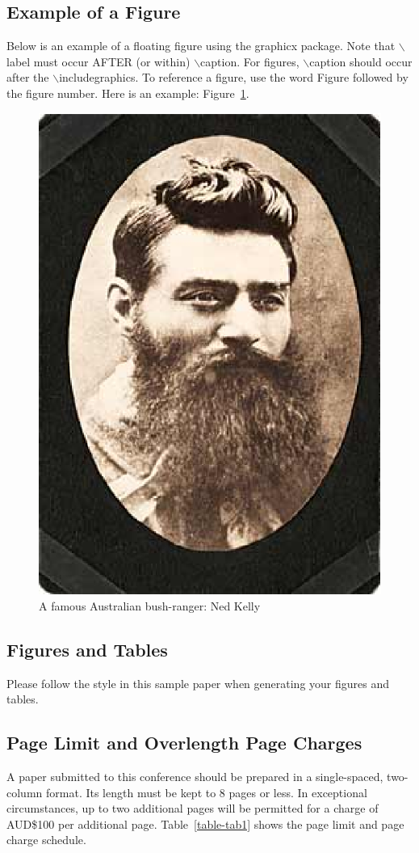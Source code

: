 \subsection{Example of a Figure}
Below is an example of a floating figure using the graphicx
package.  Note that $\backslash$label must occur AFTER (or within)
$\backslash$caption.  For figures, $\backslash$caption should occur
after the $\backslash$includegraphics.  To reference a figure, use
the word Figure followed by the figure number.  Here is an example:
Figure~\ref{figure-fig1}.

\begin{figure}[htp]
\centerline{\includegraphics[width=0.6\columnwidth]{NedKelly.eps}}
\caption{A famous Australian bush-ranger: Ned Kelly}
\label{figure-fig1}
\end{figure}

\subsection{Figures and Tables}
Please follow the style in this sample paper when generating your figures
and tables.

\subsection{Page Limit and Overlength Page Charges}
A paper submitted to this conference should be prepared in a
single-spaced, two-column format.  Its length must be kept to 8
pages or less.  In exceptional circumstances, up to two additional
pages will be permitted for a charge of AUD\$100 per additional page.
Table~\ref{table-tab1} shows the page limit and page charge schedule.

